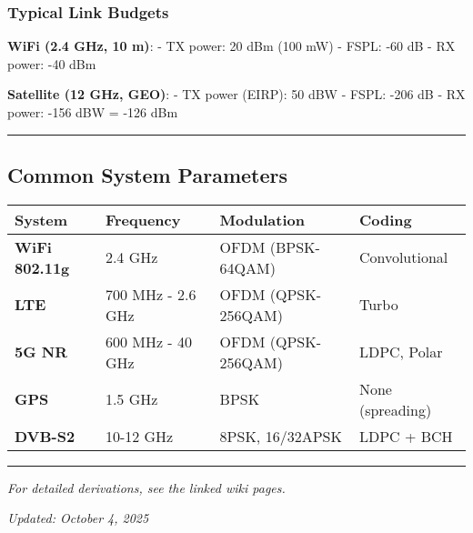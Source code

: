 \subsubsection{Typical Link Budgets}\label{typical-link-budgets}

\textbf{WiFi (2.4 GHz, 10 m)}: - TX power: 20 dBm (100 mW) - FSPL: -60
dB - RX power: -40 dBm

\textbf{Satellite (12 GHz, GEO)}: - TX power (EIRP): 50 dBW - FSPL: -206
dB - RX power: -156 dBW = -126 dBm

\begin{center}\rule{0.5\linewidth}{0.5pt}\end{center}

\subsection{\texorpdfstring{ Common System
Parameters}{ Common System Parameters}}\label{common-system-parameters}

{\def\LTcaptype{} %
\begin{longtable}[]{@{}llll@{}}
\toprule\noalign{}
System & Frequency & Modulation & Coding \\
\midrule\noalign{}
\endhead
\bottomrule\noalign{}
\endlastfoot
\textbf{WiFi 802.11g} & 2.4 GHz & OFDM (BPSK-64QAM) & Convolutional \\
\textbf{LTE} & 700 MHz - 2.6 GHz & OFDM (QPSK-256QAM) & Turbo \\
\textbf{5G NR} & 600 MHz - 40 GHz & OFDM (QPSK-256QAM) & LDPC, Polar \\
\textbf{GPS} & 1.5 GHz & BPSK & None (spreading) \\
\textbf{DVB-S2} & 10-12 GHz & 8PSK, 16/32APSK & LDPC + BCH \\
\end{longtable}
}

\begin{center}\rule{0.5\linewidth}{0.5pt}\end{center}

\emph{For detailed derivations, see the linked wiki pages.}

\emph{Updated: October 4, 2025}

